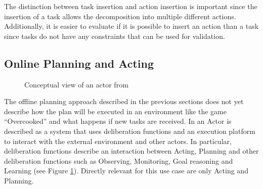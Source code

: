 The distinction between task insertion and action insertion is important since the insertion of a task allows the decomposition into multiple different actions.
Additionally, it is easier to evaluate if it is possible to insert an action than a task since tasks do not have any constraints that can be used for validation.




\subsection{Online Planning and Acting}\label{sec:acting}

\begin{figure}
  \centering
  \caption[Conceptual view of an actor]{Conceptual view of an actor from \cite{ghallabAutomatedPlanningActing2016}}
  \label{fig:background-acting-conceptual}
\end{figure}

The offline planning approach described in the previous sections does not yet describe how the plan will be executed in an environment like the game ``Overcooked'' and what happens if new tasks are received.
In \cite{ghallabAutomatedPlanningActing2016} an Actor is described as a system that uses deliberation functions and an execution platform to interact with the external environment and other actors.
In particular, deliberation functions describe an interaction between Acting, Planning and other deliberation functions such as Observing, Monitoring, Goal reasoning and Learning \citep{ingrandDeliberationAutonomousRobots2017} (see Figure \ref{fig:background-acting-conceptual}).
Directly relevant for this use case are only Acting and Planning.




